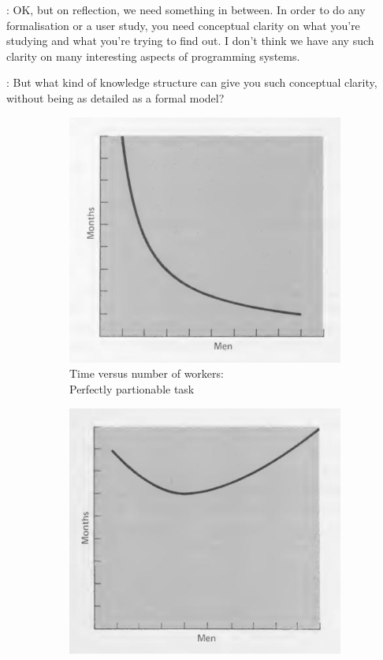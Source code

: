 \documentclass[runningheads]{llncs}
\newcommand{\T}{Tomas}
\newcommand{\J}{Joel}
\newcommand{\says}[2][gg]{\vspace{0.5em}\noindent\hangindent=0.5cm{\textsc{#1}}: #2}
\begin{document}
\says[\J]{OK, but on reflection, we need something in between. In order to do any formalisation or a user study, you need conceptual clarity on what you're studying and what you're trying to find out. I don't think we have any such clarity on many interesting aspects of programming systems.}

\says[\T]{But what kind of knowledge structure can give you such conceptual clarity, without being as detailed as a formal model?}

\begin{figure}[t]
\vspace{-0.5em}
\centering
\begin{subfigure}{0.49\textwidth}
  \centering
   \noindent
   \includegraphics[scale=0.3]{figures/mm1.png}
   \caption{Time versus number of workers:\\Perfectly partionable task}
   \label{fig:xx}
\end{subfigure}
\hfill
\begin{subfigure}{0.49\textwidth}
  \centering
   \noindent
   \includegraphics[scale=0.3]{figures/mm2.png}

\end{subfigure}
\end{figure}
\end{document}
